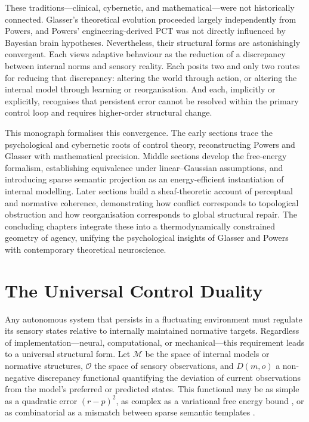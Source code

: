 \documentclass[11pt,a4paper,twoside]{article}
\begin{document}
These traditions—clinical, cybernetic, and mathematical—were not historically connected.
Glasser’s theoretical evolution proceeded largely independently from Powers,
and Powers’ engineering-derived PCT was not directly influenced by Bayesian brain hypotheses.
Nevertheless, their structural forms are astonishingly convergent.
Each views adaptive behaviour as the reduction of a discrepancy between
internal norms and sensory reality.
Each posits two and only two routes for reducing that discrepancy:
altering the world through action, or altering the internal model through learning or reorganisation.
And each, implicitly or explicitly, recognises that persistent error
cannot be resolved within the primary control loop and requires higher-order structural change.

This monograph formalises this convergence.
The early sections trace the psychological and cybernetic roots of control theory,
reconstructing Powers and Glasser with mathematical precision.
Middle sections develop the free-energy formalism, establishing equivalence under linear–Gaussian assumptions,
and introducing sparse semantic projection as an energy-efficient instantiation of internal modelling.
Later sections build a sheaf-theoretic account of perceptual and normative coherence,
demonstrating how conflict corresponds to topological obstruction
and how reorganisation corresponds to global structural repair.
The concluding chapters integrate these into a thermodynamically constrained geometry
of agency, unifying the psychological insights of Glasser and Powers with contemporary theoretical neuroscience.

\newpage


\section{The Universal Control Duality}

Any autonomous system that persists in a fluctuating environment must regulate its sensory states
relative to internally maintained normative targets.
Regardless of implementation—neural, computational, or mechanical—this requirement leads
to a universal structural form.
Let $\mathcal{M}$ be the space of internal models or normative structures,
$\mathcal{O}$ the space of sensory observations,
and $D(m,o)$ a non-negative discrepancy functional quantifying
the deviation of current observations from the model’s preferred or predicted states.
This functional may be as simple as a quadratic error $(r - p)^2$,
as complex as a variational free energy bound \cite{friston2009free},
or as combinatorial as a mismatch between sparse semantic templates \cite{elad2010sparse,olshausen1996emergence}.
\end{document}
